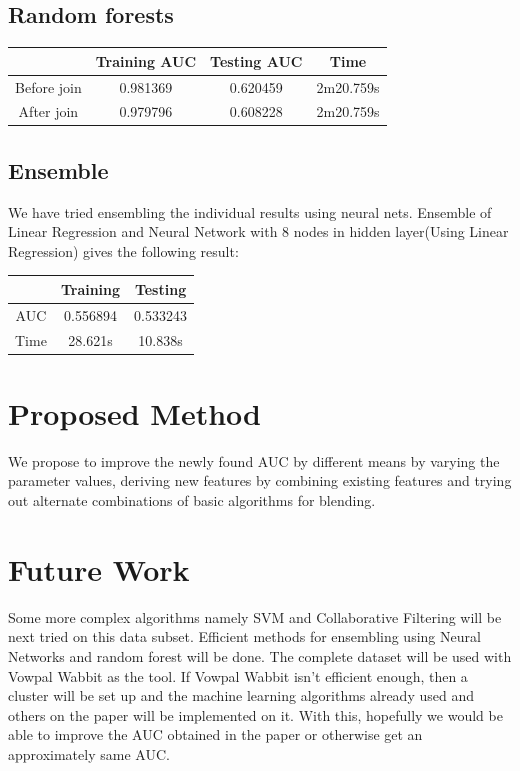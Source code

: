 \documentclass[10pt]{article}
\begin{document}
\subsection{Random forests}

\begin{center}
 \begin{tabular}{|c | c | c | c||} 
 \hline
 & Training AUC & Testing AUC & Time\\ [0.5ex] 
 \hline\hline
Before join & 0.981369 & 0.620459 & 2m20.759s\\
 \hline
After join & 0.979796 & 0.608228 & 2m20.759s\\ 
 \hline
\end{tabular}
\end{center}

\subsection{Ensemble}
We have tried ensembling the individual results using neural nets. Ensemble of Linear Regression and Neural Network with 8 nodes in hidden layer(Using Linear Regression) gives the following result:\\

\begin{center}
 \begin{tabular}{|c | c | c||} 
 \hline
 & Training & Testing\\ [0.5ex] 
 \hline\hline
AUC & 0.556894 & 0.533243\\ 
 \hline
Time & 28.621s & 10.838s\\ 
 \hline
\end{tabular}
\end{center}

\section{Proposed Method}
We propose to improve the newly found AUC by different means by varying the parameter values, deriving new features by combining existing features and trying out alternate combinations of basic algorithms for blending.
\section{Future Work}
Some more complex algorithms namely SVM and Collaborative Filtering will be next tried on this data subset. Efficient methods for ensembling using Neural Networks and random forest will be done. The complete dataset will be used with Vowpal Wabbit as the tool. If Vowpal Wabbit isn't efficient enough, then a cluster will be set up and the machine learning algorithms already used and others on the paper will be implemented on it. With this, hopefully we would be able to improve the AUC obtained in the paper or otherwise get an approximately same AUC.
\end{document}
